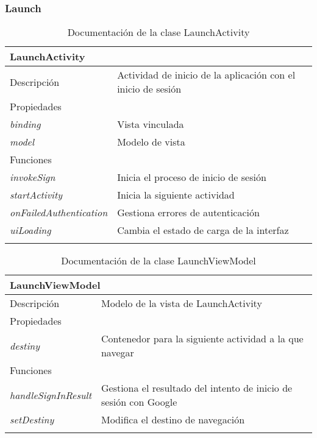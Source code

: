 \vspace{-20pt}
\subsubsection{Launch}

\begin{longtable}{|p{} p{}|}
    \hline
    \multicolumn{2}{|l|}{\textbf{LaunchActivity}} \\ \hline \hline
    Descripción      & Actividad de inicio de la aplicación con el inicio de sesión \\ \hline
    \multicolumn{2}{|l|}{Propiedades} \\
    \emph{binding}  & Vista vinculada  \\
    \emph{model}  & Modelo de vista  \\ \hline
    \multicolumn{2}{|l|}{Funciones} \\
    \emph{invokeSign}  & Inicia el proceso de inicio de sesión  \\ 
    \emph{startActivity}  & Inicia la siguiente actividad  \\ 
    \emph{onFailedAuthentication}  & Gestiona errores de autenticación  \\ 
    \emph{uiLoading}  & Cambia el estado de carga de la interfaz  \\ \hline
    \caption{Documentación de la clase LaunchActivity}
    \label{dis:app:launch_activity}
\end{longtable}

\begin{longtable}{|p{} p{}|}
    \hline
    \multicolumn{2}{|l|}{\textbf{LaunchViewModel}} \\ \hline \hline
    Descripción      & Modelo de la vista de LaunchActivity \\ \hline
    \multicolumn{2}{|l|}{Propiedades} \\
    \emph{destiny}  & Contenedor para la siguiente actividad a la que navegar  \\ \hline
    \multicolumn{2}{|l|}{Funciones} \\
    \emph{handleSignInResult}  & Gestiona el resultado del intento de inicio de sesión con Google  \\
    \emph{setDestiny}  & Modifica el destino de navegación  \\ \hline
    \caption{Documentación de la clase LaunchViewModel}
    \label{dis:app:launch_viewmodel}
\end{longtable}

